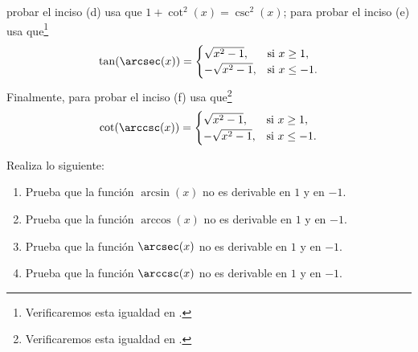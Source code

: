 \documentclass[12pt,a4paper]{book}
\begin{document}
\begin{ejercicio}
        probar el inciso (d) usa que $1+\cot^{2}(x)=\csc^{2}(x)$; para probar el inciso (e)
        usa que\footnote{Verificaremos esta igualdad en \cite{nunez2020calculoII}.}
        \begin{equation*}
            \tan(\arcsec(x))=\begin{cases}
                \sqrt{x^{2}-1}, & \text{si }x\geq 1,\\
                -\sqrt{x^{2}-1}, & \text{si }x\leq -1.
            \end{cases}
        \end{equation*}
        Finalmente, para probar el inciso (f) usa que\footnote{Verificaremos esta igualdad en \cite{nunez2020calculoII}.}
        \begin{equation*}
            \cot(\arccsc(x))=\begin{cases}
                \sqrt{x^{2}-1}, & \text{si }x\geq 1,\\
                -\sqrt{x^{2}-1}, & \text{si }x\leq -1.
            \end{cases}
        \end{equation*}
    \end{ejercicio}

    \begin{ejercicio}\label{ej:257}
        Realiza lo siguiente:
        \begin{enumerate}[nosep]
            \item Prueba que la función $\arcsin(x)$ no es derivable en $1$ y en $-1$.
            \item Prueba que la función $\arccos(x)$ no es derivable en $1$ y en $-1$.
            \item Prueba que la función $\arcsec(x)$ no es derivable en $1$ y en $-1$.
            \item Prueba que la función $\arccsc(x)$ no es derivable en $1$ y en $-1$.
        \end{enumerate}
    \end{ejercicio}
\end{document}
